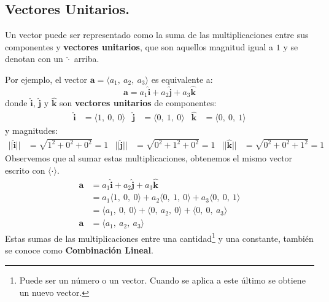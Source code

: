 \documentclass[12pt]{article}
\begin{document}
\subsection{Vectores Unitarios.}

Un vector puede ser representado como la suma de las multiplicaciones entre sus componentes y \textbf{vectores unitarios}, que son aquellos magnitud igual a $1$ y se denotan con un $\hat{\cdot}$ arriba.

Por ejemplo, el vector $\mathbf{a} = \langle a_{1}, \ a_{2}, \ a_{3} \rangle$ es equivalente a:
\[
  \mathbf{a} = a_{1}\hat{\mathbf{i}} + a_{2}\hat{\mathbf{j}} + a_{3}\hat{\mathbf{k}}
\]
donde $\hat{\mathbf{i}}$, $\hat{\mathbf{j}}$ y $\hat{\mathbf{k}}$ son \textbf{vectores unitarios} de componentes:
\begin{align*}
  \hat{\mathbf{i}} &= \langle 1, \ 0, \ 0 \rangle &
  \hat{\mathbf{j}} &= \langle 0, \ 1, \ 0 \rangle &
  \hat{\mathbf{k}} &= \langle 0, \ 0, \ 1 \rangle
\end{align*}
y magnitudes:
\begin{align*}
  ||\hat{\mathbf{i}}|| &= \sqrt{1^{2} + 0^{2} + 0^{2}} = 1 &
  ||\hat{\mathbf{j}}|| &= \sqrt{0^{2} + 1^{2} + 0^{2}} = 1 &
  ||\hat{\mathbf{k}}|| &= \sqrt{0^{2} + 0^{2} + 1^{2}} = 1
\end{align*}
Observemos que al sumar estas multiplicaciones, obtenemos el mismo vector escrito con $\langle \cdot \rangle$.
\begin{align*}
\mathbf{a} &= a_{1}\hat{\mathbf{i}} + a_{2}\hat{\mathbf{j}} + a_{3}\hat{\mathbf{k}} \\
           &= a_{1} \langle 1, \ 0, \ 0 \rangle + a_{2} \langle 0, \ 1, \ 0 \rangle + a_{3} \langle 0, \ 0, \ 1 \rangle \\
           &= \langle a_{1}, \ 0, \ 0 \rangle + \langle 0, \ a_{2}, \ 0 \rangle + \langle 0, \ 0, \ a_{3} \rangle \\
\mathbf{a} &= \langle a_{1}, \ a_{2}, \ a_{3} \rangle
\end{align*}
Estas sumas de las multiplicaciones entre una cantidad\footnote{Puede ser un número o un vector. Cuando se aplica a este último se obtiene un nuevo vector.} y una constante, también se conoce como \textbf{Combinación Lineal}.
\end{document}
